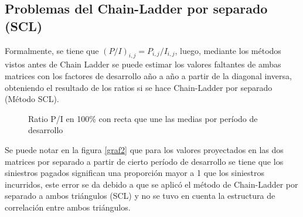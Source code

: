 \documentclass[
  12pt,
]{article}
\begin{document}
\subsection{Problemas del Chain-Ladder por separado
(SCL)}\label{problemas-del-chain-ladder-por-separado-scl}

Formalmente, se tiene que \((P/I)_{i,j} = P_{i,j}/I_{i,j}\), luego,
mediante los métodos vistos antes de Chain Ladder se puede estimar los
valores faltantes de ambas matrices con los factores de desarrollo año a
año a partir de la diagonal inversa, obteniendo el resultado de los
ratios si se hace Chain-Ladder por separado (Método SCL).

\begin{figure}
\caption{\label{graficos} Ratio P/I en 100\% con recta que une las medias por período de desarrollo}\label{fig:unnamed-chunk-23}
\end{figure}

Se puede notar en la figura \ref{graf2} que para los valores proyectados
en las dos matrices por separado a partir de cierto período de
desarrollo se tiene que los siniestros pagados significan una proporción
mayor a 1 que los siniestros incurridos, este error se da debido a que
se aplicó el método de Chain-Ladder por separado a ambos triángulos
(SCL) y no se tuvo en cuenta la estructura de correlación entre ambos
triángulos.
\end{document}
